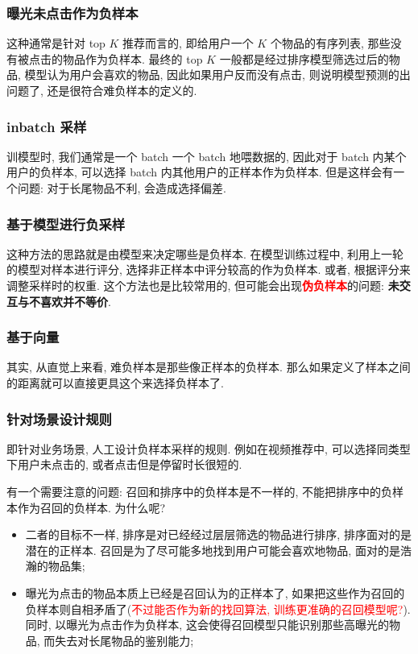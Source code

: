 \subsubsection{曝光未点击作为负样本}
这种通常是针对 top $K$ 推荐而言的, 即给用户一个 $K$ 个物品的有序列表, 那些没有被点击的物品作为负样本. 最终的 top $K$ 一般都是经过排序模型筛选过后的物品, 模型认为用户会喜欢的物品, 因此如果用户反而没有点击, 则说明模型预测的出问题了, 还是很符合难负样本的定义的. 

\subsubsection{inbatch 采样}
训模型时, 我们通常是一个 batch 一个 batch 地喂数据的, 因此对于 batch 内某个用户的负样本, 可以选择 batch 内其他用户的正样本作为负样本. 但是这样会有一个问题: 对于长尾物品不利, 会造成选择偏差.

\subsubsection{基于模型进行负采样}
这种方法的思路就是由模型来决定哪些是负样本. 在模型训练过程中, 利用上一轮的模型对样本进行评分, 选择非正样本中评分较高的作为负样本. 或者, 根据评分来调整采样时的权重. 这个方法也是比较常用的, 但可能会出现\textcolor{red}{\textbf{伪负样本}}的问题: \textbf{未交互与不喜欢并不等价}.

\subsubsection{基于向量}
其实, 从直觉上来看, 难负样本是那些像正样本的负样本. 那么如果定义了样本之间的距离就可以直接更具这个来选择负样本了.

\subsubsection{针对场景设计规则}
即针对业务场景, 人工设计负样本采样的规则. 例如在视频推荐中, 可以选择同类型下用户未点击的, 或者点击但是停留时长很短的.

有一个需要注意的问题: 召回和排序中的负样本是不一样的, 不能把排序中的负样本作为召回的负样本. 为什么呢?
\begin{itemize}
	\item 二者的目标不一样, 排序是对已经经过层层筛选的物品进行排序, 排序面对的是潜在的正样本. 召回是为了尽可能多地找到用户可能会喜欢地物品, 面对的是浩瀚的物品集;
	
	\item 曝光为点击的物品本质上已经是召回认为的正样本了, 如果把这些作为召回的负样本则自相矛盾了(\textcolor{red}{不过能否作为新的找回算法, 训练更准确的召回模型呢?}). 同时, 以曝光为点击作为负样本, 这会使得召回模型只能识别那些高曝光的物品, 而失去对长尾物品的鉴别能力;
	
\end{itemize}